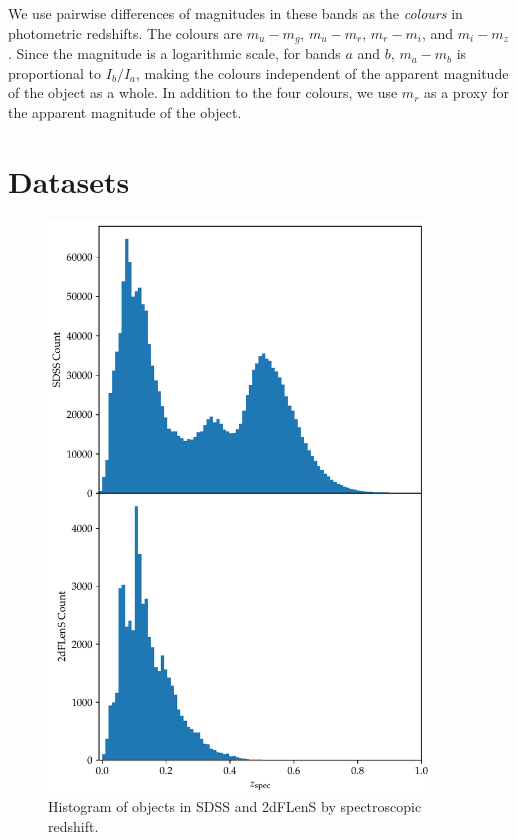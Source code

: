 \documentclass[11pt,twoside,openright]{report}
\begin{document}
  We use pairwise differences of magnitudes in these bands as the \emph{colours} in photometric redshifts. The colours are $m_u - m_g$, $m_u - m_r$, $m_r - m_i$, and $m_i - m_z$. \citep{Alasdair} Since the magnitude is a logarithmic scale, for bands $a$ and $b$, $m_a - m_b$ is proportional to $I_b / I_a$, making the colours independent of the apparent magnitude of the object as a whole. In addition to the four colours, we use $m_r$ as a proxy for the apparent magnitude of the object.

  \section{Datasets}

  \begin{figure}
    \centering
    \includegraphics[width=0.9\textwidth]{zspec_hist.pdf}
    \caption{Histogram of objects in SDSS and 2dFLenS by spectroscopic redshift.}
    \label{fig:spec_hist}
  \end{figure}
\end{document}
